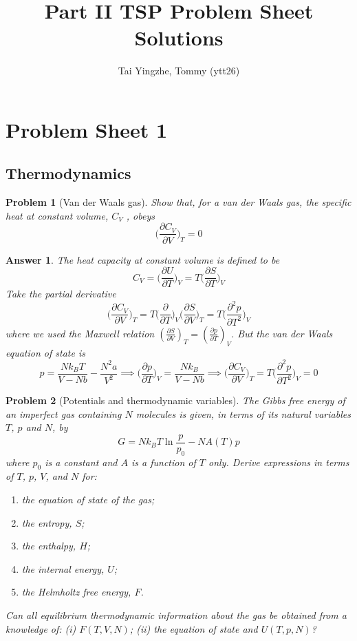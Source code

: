 \documentclass[a4paper]{article}
\title{\textbf{Part II TSP Problem Sheet Solutions}}
\author{Tai Yingzhe, Tommy (ytt26)}
\date{}
\newtheorem{ans}{Answer}[section]
\theoremstyle{new}
\newtheorem{qns}{Problem}[section]
\begin{document}
\maketitle
\tableofcontents
\newpage
\section{Problem Sheet 1}
\subsection*{Thermodynamics}
\begin{qns}[Van der Waals gas]
Show that, for a van der Waals gas, the specific heat at constant volume, $C_V$ , obeys 
$$\bigg(\frac{\partial C_V}{\partial V}\bigg)_T=0$$
\end{qns}
\begin{ans}
The heat capacity at constant volume is defined to be
$$C_V=\bigg(\frac{\partial U}{\partial T}\bigg)_V=T\bigg(\frac{\partial S}{\partial T}\bigg)_V$$
Take the partial derivative
$$\bigg(\frac{\partial C_V}{\partial V}\bigg)_T=T\bigg(\frac{\partial}{\partial T}\bigg)_V\bigg(\frac{\partial S}{\partial V}\bigg)_T=T\bigg(\frac{\partial^2p}{\partial T^2}\bigg)_V$$
where we used the Maxwell relation $(\frac{\partial S}{\partial V})_T=(\frac{\partial p}{\partial T})_V$. But the van der Waals equation of state is
$$p=\frac{Nk_BT}{V-Nb}-\frac{N^2a}{V^2}\implies\bigg(\frac{\partial p}{\partial T}\bigg)_V=\frac{Nk_B}{V-Nb}\implies\bigg(\frac{\partial C_V}{\partial V}\bigg)_T=T\bigg(\frac{\partial^2p}{\partial T^2}\bigg)_V=0$$
\end{ans}
\begin{qns}[Potentials and thermodynamic variables]
The Gibbs free energy of an imperfect gas containing $N$ molecules is given, in terms of its natural variables $T$, $p$ and $N$, by
$$G=Nk_BT\ln\frac{p}{p_0}-NA(T)p$$
where $p_0$ is a constant and $A$ is a function of $T$ only. Derive expressions in terms of $T$, $p$, $V$, and $N$ for:
\begin{enumerate}[label=(\alph*)]
\item the equation of state of the gas;
\item the entropy, $S$;
\item the enthalpy, $H$;
\item the internal energy, $U$;
\item the Helmholtz free energy, $F$.
\end{enumerate}
Can all equilibrium thermodynamic information about the gas be obtained from a knowledge of: (i) $F(T, V, N)$; (ii) the equation of state and $U(T, p, N)$?
\end{qns}
\end{document}
